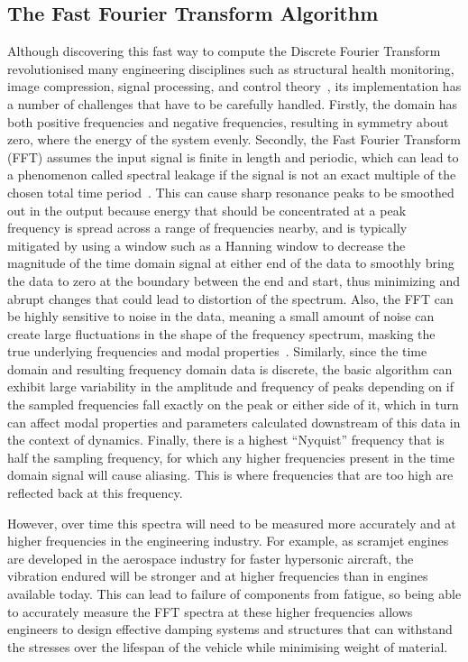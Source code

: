 \documentclass[12pt]{article}
\begin{document}
    \subsection{The Fast Fourier Transform Algorithm}
    Although discovering this fast way to compute the Discrete Fourier Transform revolutionised many engineering disciplines such as structural health monitoring, image compression, signal processing, and control theory~\cite{Byjus2023}, its implementation has a number of challenges that have to be carefully handled.
    Firstly, the domain has both positive frequencies and negative frequencies, resulting in symmetry about zero, where the energy of the system evenly.
    Secondly, the Fast Fourier Transform (FFT) assumes the input signal is finite in length and periodic, which can lead to a phenomenon called spectral leakage if the signal is not an exact multiple of the chosen total time period~\cite{MathStackExchange2023}.
    This can cause sharp resonance peaks to be smoothed out in the output because energy that should be concentrated at a peak frequency is spread across a range of frequencies nearby, and is typically mitigated by using a window such as a Hanning window to decrease the magnitude of the time domain signal at either end of the data to smoothly bring the data to zero at the boundary between the end and start, thus minimizing and abrupt changes that could lead to distortion of the spectrum.
    Also, the FFT can be highly sensitive to noise in the data, meaning a small amount of noise can create large fluctuations in the shape of the frequency spectrum, masking the true underlying frequencies and modal properties~\cite{MathStackExchange2023}.
    Similarly, since the time domain and resulting frequency domain data is discrete, the basic algorithm can exhibit large variability in the amplitude and frequency of peaks depending on if the sampled frequencies fall exactly on the peak or either side of it, which in turn can affect modal properties and parameters calculated downstream of this data in the context of dynamics.
    Finally, there is a highest ``Nyquist'' frequency that is half the sampling frequency, for which any higher frequencies present in the time domain signal will cause aliasing.
    This is where frequencies that are too high are reflected back at this frequency.

    However, over time this spectra will need to be measured more accurately and at higher frequencies in the engineering industry.
    For example, as scramjet engines are developed in the aerospace industry for faster hypersonic aircraft, the vibration endured will be stronger and at higher frequencies than in engines available today.
    This can lead to failure of components from fatigue, so being able to accurately measure the FFT spectra at these higher frequencies allows engineers to design effective damping systems and structures that can withstand the stresses over the lifespan of the vehicle while minimising weight of material.
\end{document}
